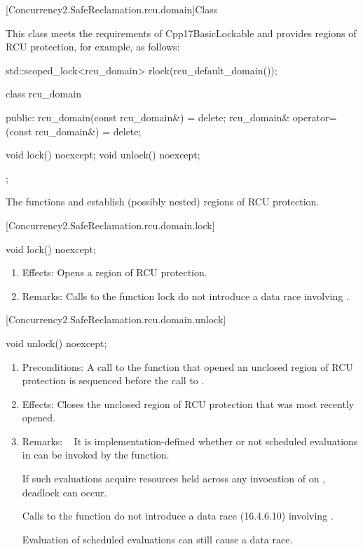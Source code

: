 [Concurrency2.SafeReclamation.rcu.domain]{Class }


This class meets the requirements of Cpp17BasicLockable  and provides regions of RCU protection, for example, as follows:

\begin{codeblock}
std::scoped_lock<rcu_domain> rlock(rcu_default_domain());
\end{codeblock}

\begin{codeblock}
class rcu_domain {
public:
  rcu_domain(const rcu_domain&) = delete;
  rcu_domain& operator=(const rcu_domain&) = delete;

  void lock() noexcept;
  void unlock() noexcept;
};
\end{codeblock}

The functions  and  establish (possibly nested)
regions of RCU protection.

[Concurrency2.SafeReclamation.rcu.domain.lock]{}

\begin{codeblock}
void lock() noexcept;
\end{codeblock}

\begin{enumerate}
\item	Effects: Opens a region of RCU protection.
\item	Remarks: Calls to the function lock do not introduce a data race
	 involving .
\end{enumerate}

[Concurrency2.SafeReclamation.rcu.domain.unlock]{}

\begin{codeblock}
void unlock() noexcept;
\end{codeblock}

\begin{enumerate}
\item	Preconditions: A call to the function  that opened
	an unclosed region of RCU protection is sequenced before the
	call to .
\item	Effects: Closes the unclosed region of RCU protection that was
	most recently opened.
\item	Remarks:   It is implementation-defined whether or not scheduled
	evaluations in  can be invoked by the 
	function.
	\begin{note}
	If such evaluations acquire resources held across any invocation
	of  on , deadlock can occur.
	\end{note}
	Calls to the function  do not introduce a data race
	(16.4.6.10) involving \tcode{*this}.
	\begin{note}
	Evaluation of scheduled evaluations can still cause a data race.
	\end{note}
\end{enumerate}

